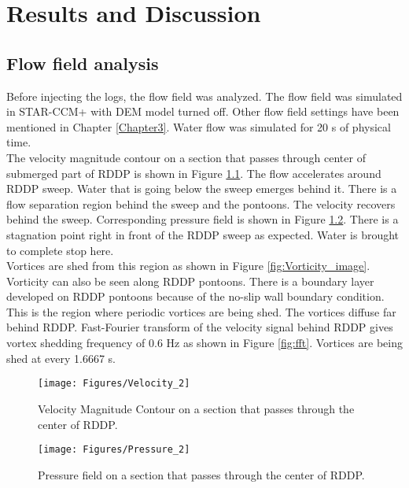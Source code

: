 
\chapter{Results and Discussion} %

\label{Chapter4} %
\FloatBarrier
\section{Flow field analysis}
Before injecting the logs, the flow field was analyzed. The flow field was simulated in STAR-CCM+ with DEM model turned off. Other flow field settings have been mentioned in Chapter \ref{Chapter3}. Water flow was simulated for 20 s of physical time.\\ 
The velocity magnitude contour on a section that passes through center of submerged part of RDDP is shown in Figure \ref{fig:Vel_Mag_middle}. The flow accelerates around RDDP sweep. Water that is going below the sweep emerges behind it. There is a flow separation region behind the sweep and the pontoons. The velocity recovers behind the sweep. Corresponding pressure field is shown in Figure \ref{fig:Pressure_middle}. There is a stagnation point right in front of the RDDP sweep as expected. Water is brought to complete stop here.\\ 
Vortices are shed from this region as shown in Figure \ref{fig:Vorticity_image}. Vorticity can also be seen along RDDP pontoons. There is a boundary layer developed on RDDP pontoons because of the no-slip wall boundary condition. This is the region where periodic vortices are being shed. The vortices diffuse far behind RDDP. Fast-Fourier transform of the velocity signal behind RDDP gives vortex shedding frequency of 0.6 Hz as shown in Figure \ref{fig:fft}. Vortices are being shed at every 1.6667 s. 

\begin{figure}
\centering
\texttt{[image: Figures/Velocity\_2]}
\caption{\label{fig:Vel_Mag_middle}Velocity Magnitude Contour on a section that passes through the center of RDDP.}
\end{figure}

\begin{figure}
\centering
\texttt{[image: Figures/Pressure\_2]}
\caption{\label{fig:Pressure_middle}Pressure field on a section that passes through the center of RDDP.}
\end{figure}

